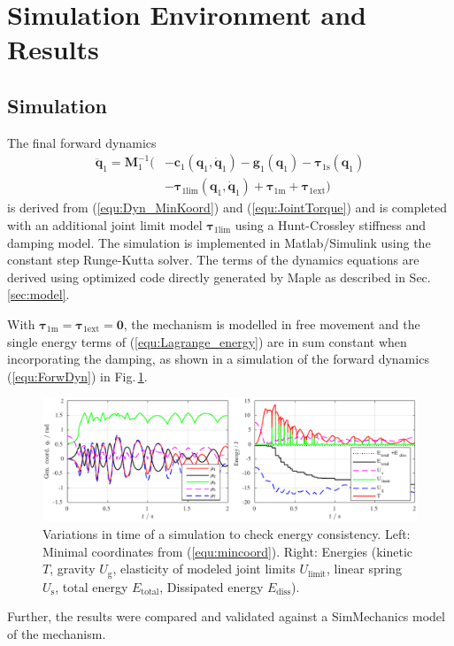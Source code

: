 \documentclass[twocolumn,10pt]{IFTOMM}
\newcommand{\bm}[1]{\boldsymbol{#1}}
\begin{document}
\section{Simulation Environment and Results}
\label{sec:simulation}

\subsection{Simulation}

The final forward dynamics
\begin{align}
\ddot{\bm{q}}_1 = \bm{M}_1^{-1}( &-\bm{c}_1(\bm{q}_1,\dot{\bm{q}}_1)-\bm{g}_1(\bm{q}_1) -\bm{\tau}_{1\mathrm{s}}(\bm{q}_1) \nonumber \\
& - \bm{\tau}_{1\mathrm{lim}}(\bm{q}_1,\dot{\bm{q}}_1)  + \bm{\tau}_{1\mathrm{m}} + \bm{\tau}_{1\mathrm{ext}})
\label{equ:ForwDyn}
\end{align}
is derived from (\ref{equ:Dyn_MinKoord}) and (\ref{equ:JointTorque}) and is completed with an additional joint limit model $\bm{\tau}_{1\mathrm{lim}}$ using a Hunt-Crossley stiffness and damping model.
The simulation is implemented in Matlab/Simulink using the constant step Runge-Kutta solver.
The terms of the dynamics equations are derived using optimized code directly generated by Maple as described in Sec.\,\ref{sec:model}.

With ${\bm{\tau}_{1\mathrm{m}} = \bm{\tau}_{1\mathrm{ext}} = \bm{0}}$, the mechanism is modelled in free movement and the single energy terms of (\ref{equ:Lagrange_energy}) are in sum constant when incorporating the damping, as shown in a simulation of the forward dynamics (\ref{equ:ForwDyn}) in Fig.\,\ref{fig:SimulationEnergiekonsistenz}.
%
\begin{figure}[htb!]
    \includegraphics{figures/KAS5m5_Gelenkgrenzmodell_q_E.pdf} 
    \vspace{-0.4cm}
    \caption{Variations in time of a simulation to check energy consistency. Left: Minimal coordinates from (\ref{equ:mincoord}). Right: Energies (kinetic $T$, gravity $U_{\mathrm{g}}$, elasticity of modeled joint limits $U_{\mathrm{limit}}$, linear spring $U_{\mathrm{s}}$, total energy $E_{\mathrm{total}}$, Dissipated energy $E_{\mathrm{diss}}$).}
    \label{fig:SimulationEnergiekonsistenz}
    \vspace{-0.2cm}
\end{figure}
%
Further, the results were compared and validated against a SimMechanics model of the mechanism.
\end{document}
